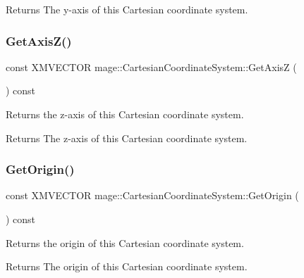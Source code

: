 \begin{DoxyReturn}{Returns}
The y-\/axis of this Cartesian coordinate system. 
\end{DoxyReturn}
\hypertarget{structmage_1_1_cartesian_coordinate_system_a9d5c1cc1fa21ea0ac79054acfb676a24}{}\label{structmage_1_1_cartesian_coordinate_system_a9d5c1cc1fa21ea0ac79054acfb676a24} 
\subsubsection{\texorpdfstring{Get\+Axis\+Z()}{GetAxisZ()}}
{\footnotesize\ttfamily const X\+M\+V\+E\+C\+T\+OR mage\+::\+Cartesian\+Coordinate\+System\+::\+Get\+AxisZ (\begin{DoxyParamCaption}{ }\end{DoxyParamCaption}) const\hspace{0.3cm}{\ttfamily [noexcept]}}

Returns the z-\/axis of this Cartesian coordinate system.

\begin{DoxyReturn}{Returns}
The z-\/axis of this Cartesian coordinate system. 
\end{DoxyReturn}
\hypertarget{structmage_1_1_cartesian_coordinate_system_add81a0efb47b0aa4084d803ba1a684e6}{}\label{structmage_1_1_cartesian_coordinate_system_add81a0efb47b0aa4084d803ba1a684e6} 
\subsubsection{\texorpdfstring{Get\+Origin()}{GetOrigin()}}
{\footnotesize\ttfamily const X\+M\+V\+E\+C\+T\+OR mage\+::\+Cartesian\+Coordinate\+System\+::\+Get\+Origin (\begin{DoxyParamCaption}{ }\end{DoxyParamCaption}) const\hspace{0.3cm}{\ttfamily [noexcept]}}

Returns the origin of this Cartesian coordinate system.

\begin{DoxyReturn}{Returns}
The origin of this Cartesian coordinate system. 
\end{DoxyReturn}
\hypertarget{structmage_1_1_cartesian_coordinate_system_acf9dab4edc5c07b5bbf6bee0bdfe317c}{}\label{structmage_1_1_cartesian_coordinate_system_acf9dab4edc5c07b5bbf6bee0bdfe317c} 
